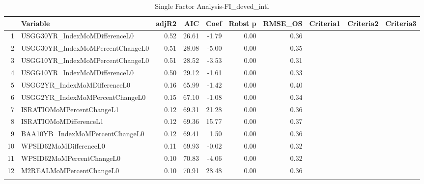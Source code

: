 \begin{longtable}{rlrrrrrlll}
  \hline
 & Variable & adjR2 & AIC & Coef & Robst p & RMSE\_OS & Criteria1 & Criteria2 & Criteria3 \\ 
  \hline
1 & USGG30YR\_IndexMoMDifferenceL0 & 0.52 & 26.61 & -1.79 & 0.00 & 0.36 &  &  &  \\ 
  2 & USGG30YR\_IndexMoMPercentChangeL0 & 0.51 & 28.08 & -5.00 & 0.00 & 0.35 &  &  &  \\ 
  3 & USGG10YR\_IndexMoMPercentChangeL0 & 0.51 & 28.52 & -3.53 & 0.00 & 0.31 &  &  &  \\ 
  4 & USGG10YR\_IndexMoMDifferenceL0 & 0.50 & 29.12 & -1.61 & 0.00 & 0.33 &  &  &  \\ 
  5 & USGG2YR\_IndexMoMDifferenceL0 & 0.16 & 65.99 & -1.42 & 0.00 & 0.40 &  &  &  \\ 
  6 & USGG2YR\_IndexMoMPercentChangeL0 & 0.15 & 67.10 & -1.08 & 0.00 & 0.34 &  &  &  \\ 
  7 & ISRATIOMoMPercentChangeL1 & 0.12 & 69.31 & 21.28 & 0.00 & 0.36 &  &  &  \\ 
  8 & ISRATIOMoMDifferenceL1 & 0.12 & 69.36 & 15.77 & 0.00 & 0.37 &  &  &  \\ 
  9 & BAA10YB\_IndexMoMPercentChangeL0 & 0.12 & 69.41 & 1.50 & 0.00 & 0.36 &  &  &  \\ 
  10 & WPSID62MoMDifferenceL0 & 0.11 & 69.93 & -0.02 & 0.00 & 0.32 &  &  &  \\ 
  11 & WPSID62MoMPercentChangeL0 & 0.10 & 70.83 & -4.06 & 0.00 & 0.32 &  &  &  \\ 
  12 & M2REALMoMPercentChangeL0 & 0.10 & 70.91 & 28.48 & 0.00 & 0.36 &  &  &  \\ 
   \hline
\hline
\caption{Single Factor Analysis-FI_deved_intl} 
\end{longtable}
